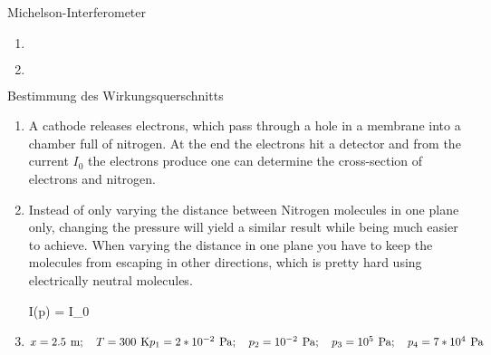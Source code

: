 \documentclass{alex_hü}
\begin{document}
\renewcommand{\labelenumi}{\alph{enumi})}


\begin{mybox}{Michelson-Interferometer}
	\centering \(  \)
	\tcblower
	\begin{enumerate}
		\item \(  \)
		\tcbline
		\item \(  \)
	\end{enumerate}
\end{mybox}

\begin{mybox}{Bestimmung des Wirkungsquerschnitts}
	\centering \(  \)
	\tcblower
	\begin{enumerate}
		\item A cathode releases electrons, which pass through a hole in a membrane into a chamber full of nitrogen. At the end the electrons hit a detector and from the current \( I_{0} \) the electrons produce one can determine the cross-section of electrons and nitrogen.  
	\tcbline
		\item Instead of only varying the distance between Nitrogen molecules in one plane only, changing the pressure will yield a similar result while being much easier to achieve. When varying the distance in one plane you have to keep the molecules from escaping in other directions, which is pretty hard using electrically neutral molecules. \\
		\begin{flalign*}
			I(p) = I_0\expo[-][\beta p]
		\end{flalign*}
	\tcbline
		\item \( x = 2.5 \unit{m};\quad T = 300 \unit{K} \\ 
		p_1 = 2 * 10^{-2} \unit{Pa};\quad p_2 = 10^{-2} \unit{Pa};\quad  p_3 = 10^5 \unit{Pa};\quad p_4 = 7 * 10^4 \unit{Pa} \)
	\end{enumerate}
\end{mybox}
\end{document}
